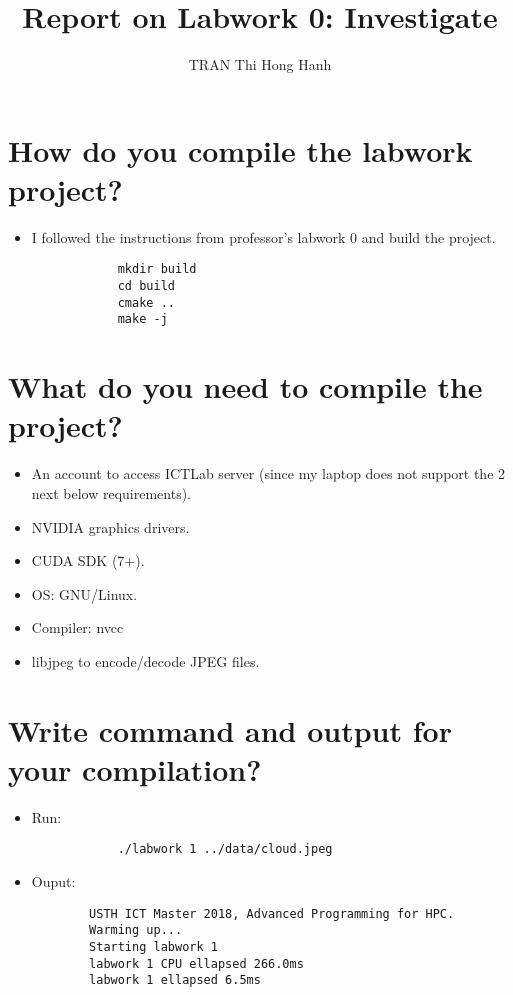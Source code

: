 \documentclass{article}
\title{Report on Labwork 0: Investigate}
\author{TRAN Thi Hong Hanh}
\begin{document}
\maketitle
\section{How do you compile the labwork project?}
    \begin{itemize}
    \item I followed the instructions from professor's labwork 0 and build the project.
        \begin{verbatim}
            mkdir build
            cd build
            cmake ..
            make -j
        \end{verbatim}
    \end{itemize}
\section{What do you need to compile the project?}
    \begin{itemize}
        \item An account to access ICTLab server (since my laptop does not support the 2 next below requirements).
        \item NVIDIA graphics drivers.
        \item CUDA SDK (7+).
        \item OS: GNU/Linux.
        \item Compiler: nvcc
        \item libjpeg to encode/decode JPEG files.
    \end{itemize}
\section{Write command and output for your compilation?}
    \begin{itemize}
        \item Run:
        \begin{verbatim}
            ./labwork 1 ../data/cloud.jpeg 
        \end{verbatim}
        \item Ouput:
        \begin{verbatim}
        USTH ICT Master 2018, Advanced Programming for HPC.
        Warming up...
        Starting labwork 1
        labwork 1 CPU ellapsed 266.0ms
        labwork 1 ellapsed 6.5ms
        \end{verbatim}
    \end{itemize}
\end{document}
